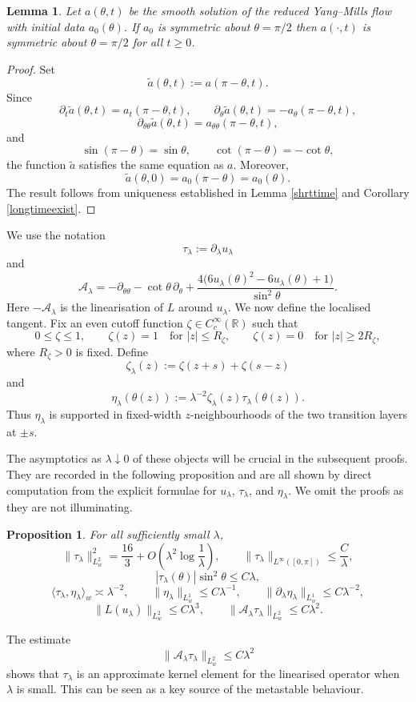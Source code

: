 \documentclass[11pt,a4paper]{article}
\numberwithin{equation}{section}
\theoremstyle{plain}
\newtheorem{lemma}[theorem]{Lemma}
\newtheorem{proposition}[theorem]{Proposition}
\theoremstyle{remark}
\begin{document}
\begin{lemma}
Let $a(\theta,t)$ be the smooth solution of the reduced Yang--Mills flow with initial data $a_0(\theta)$. If $a_0$ is symmetric about $\theta=\pi/2$ then $a(\cdot,t)$ is symmetric about $\theta=\pi/2$ for all $t\geq0$.
\end{lemma}

\begin{proof}
Set
$$
\widetilde a(\theta,t):=a(\pi-\theta,t).
$$
Since
$$
\partial_t\widetilde a(\theta,t)=a_t(\pi-\theta,t),
\qquad
\partial_\theta\widetilde a(\theta,t)=-a_\theta(\pi-\theta,t),
$$
$$
\partial_{\theta\theta}\widetilde a(\theta,t)
=
a_{\theta\theta}(\pi-\theta,t),
$$
and
$$
\sin(\pi-\theta)=\sin\theta,
\qquad
\cot(\pi-\theta)=-\cot\theta,
$$
the function $\widetilde a$ satisfies the same equation as $a$. Moreover,
$$
\widetilde a(\theta,0)
=
a_0(\pi-\theta)
=
a_0(\theta).
$$
The result follows from uniqueness established in Lemma \ref{shrttime} and Corollary \ref{longtimeexist}.
\end{proof}

We use the notation
$$
\tau_\lambda:=\partial_\lambda u_\lambda
$$
and
$$
\mathcal A_\lambda
=
-\partial_{\theta\theta}
-\cot\theta\,\partial_\theta
+
\frac{4\bigl(6u_\lambda(\theta)^2-6u_\lambda(\theta)+1\bigr)}
{\sin^2\theta}.
$$
Here $-\mathcal A_\lambda$ is the linearisation of $L$ around $u_\lambda$. We now define the localised tangent. Fix an even cutoff function $\zeta\in C_c^\infty(\mathbb R)$ such that
$$
0\leq\zeta\leq1,
\qquad
\zeta(z)=1\quad\text{for }|z|\leq R_\zeta,
\qquad
\zeta(z)=0\quad\text{for }|z|\geq2R_\zeta,
$$
where $R_\zeta>0$ is fixed. Define
$$
\zeta_\lambda(z)
:=
\zeta(z+s)
+
\zeta(s-z)
$$
and
$$
\eta_\lambda(\theta(z))
:=
\lambda^{-2}\zeta_\lambda(z)\tau_\lambda(\theta(z)).
$$
Thus $\eta_\lambda$ is supported in fixed-width $z$-neighbourhoods of the two transition layers at $\pm s$. 

The asymptotics as $\lambda\downarrow0$ of these objects will be crucial in the subsequent proofs. They are recorded in the following proposition and are all shown by direct computation from the explicit formulae for
$u_\lambda$, $\tau_\lambda$, and $\eta_\lambda$. We omit the proofs as they are not illuminating.

\begin{proposition}\label{norms}
For all sufficiently small $\lambda$,
$$
\|\tau_\lambda\|_{L_w^2}^2
=
\frac{16}{3}
+
O\left(
\lambda^2\log\frac1\lambda
\right),
\qquad
\|\tau_\lambda\|_{L^\infty([0,\pi])}
\leq
\frac{C}{\lambda},
$$
$$
|\tau_\lambda(\theta)|\sin^2\theta
\leq
C\lambda,
$$
$$
\langle\tau_\lambda,\eta_\lambda\rangle_w
\asymp
\lambda^{-2},
\qquad
\|\eta_\lambda\|_{L_w^1}
\leq
C\lambda^{-1},
\qquad
\|\partial_\lambda\eta_\lambda\|_{L_w^1}
\leq
C\lambda^{-2},
$$
$$
\|L(u_\lambda)\|_{L_w^2}
\leq
C\lambda^3,
\qquad
\|\mathcal A_\lambda\tau_\lambda\|_{L_w^2}
\leq
C\lambda^2.
$$
\end{proposition}
\noindent
The estimate
$$
\|\mathcal A_\lambda\tau_\lambda\|_{L_w^2}
\leq
C\lambda^2
$$
shows that $\tau_\lambda$ is an approximate kernel element for the linearised operator when $\lambda$ is small. This can be seen as a key source of the metastable behaviour.
\end{document}
